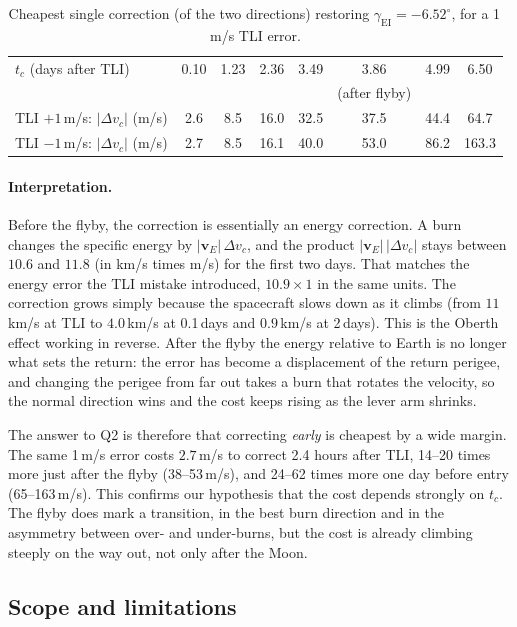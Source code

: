 \documentclass[11pt]{article}
\newcommand{\vE}{\mathbf{v}_E}
\newcommand{\gEI}{\gamma_{\mathrm{EI}}}
\begin{document}
\begin{table}[h]
\centering
\caption{Cheapest single correction (of the two directions) restoring $\gEI = -6.52^\circ$, for a 1\,m/s TLI error.}
\label{tab:q2}
\begin{tabular}{@{}lccccccc@{}}
\toprule
$t_c$ (days after TLI) & 0.10 & 1.23 & 2.36 & 3.49 & 3.86 & 4.99 & 6.50 \\
& & & & & (after flyby) & & \\
\midrule
TLI $+1$\,m/s: $|\Delta v_c|$ (m/s) & 2.6 & 8.5 & 16.0 & 32.5 & 37.5 & 44.4 & 64.7 \\
TLI $-1$\,m/s: $|\Delta v_c|$ (m/s) & 2.7 & 8.5 & 16.1 & 40.0 & 53.0 & 86.2 & 163.3 \\
\bottomrule
\end{tabular}
\end{table}

\paragraph{Interpretation.} Before the flyby, the correction is essentially an energy correction. A burn changes the specific energy by $|\vE|\,\Delta v_c$, and the product $|\vE|\,|\Delta v_c|$ stays between $10.6$ and $11.8$ (in km/s times m/s) for the first two days. That matches the energy error the TLI mistake introduced, $10.9 \times 1$ in the same units. The correction grows simply because the spacecraft slows down as it climbs (from $11$\,km/s at TLI to $4.0$\,km/s at 0.1\,days and $0.9$\,km/s at 2\,days). This is the Oberth effect working in reverse. After the flyby the energy relative to Earth is no longer what sets the return: the error has become a displacement of the return perigee, and changing the perigee from far out takes a burn that rotates the velocity, so the normal direction wins and the cost keeps rising as the lever arm shrinks.

The answer to Q2 is therefore that correcting \emph{early} is cheapest by a wide margin. The same 1\,m/s error costs $2.7$\,m/s to correct 2.4 hours after TLI, 14--20 times more just after the flyby (38--53\,m/s), and 24--62 times more one day before entry (65--163\,m/s). This confirms our hypothesis that the cost depends strongly on $t_c$. The flyby does mark a transition, in the best burn direction and in the asymmetry between over- and under-burns, but the cost is already climbing steeply on the way out, not only after the Moon.

\subsection{Scope and limitations}
\end{document}
